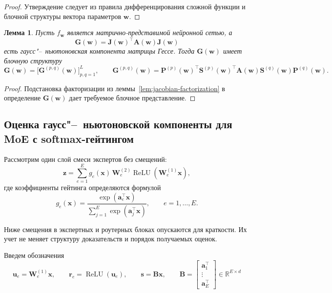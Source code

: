 \documentclass[11pt]{extarticle}
\DeclareMathOperator{\ReLU}{ReLU}
\newtheorem{lemma}{Лемма}
\theoremstyle{definition}
\theoremstyle{plain}
\theoremstyle{remark}
\begin{document}
\begin{proof}
Утверждение следует из правила дифференцирования сложной функции и блочной структуры вектора параметров $\mathbf w$.
\end{proof}

\begin{lemma}
\label{lem:GN-block-factorization}
Пусть $f_{\mathbf w}$ является матрично-представимой нейронной сетью, а
$$
\mathbf G(\mathbf w)=\mathbf J(\mathbf w)^\top \mathbf A(\mathbf w)\mathbf J(\mathbf w)
$$
есть гаусс"--~ньютоновская компонента матрицы Гессе. Тогда $\mathbf G(\mathbf w)$ имеет блочную структуру
$$
\mathbf G(\mathbf w)=\bigl[\mathbf G^{(p,q)}(\mathbf w)\bigr]_{p,q=1}^L,
\qquad
\mathbf G^{(p,q)}(\mathbf w)
=
\mathbf P^{(p)}(\mathbf w)^\top
\mathbf S^{(p)}(\mathbf w)^\top
\mathbf A(\mathbf w)
\mathbf S^{(q)}(\mathbf w)
\mathbf P^{(q)}(\mathbf w).
$$
\end{lemma}

\begin{proof}
Подстановка факторизации из леммы~\ref{lem:jacobian-factorization} в определение $\mathbf G(\mathbf w)$ дает требуемое блочное представление.
\end{proof}

\subsection{Оценка гаусс"--~ньютоновской компоненты для MoE с softmax-гейтингом}

Рассмотрим один слой смеси экспертов без смещений:
\begin{equation}
    \label{eq:moe-model-softmax}
    \mathbf z
    =
    \sum\limits_{e=1}^{E}
    g_e(\mathbf x)\,
    \mathbf W_e^{(2)}
    \ReLU\!\left(\mathbf W_e^{(1)}\mathbf x\right),
\end{equation}
где коэффициенты гейтинга определяются формулой
\begin{equation}
    \label{eq:moe-softmax-gating}
    g_e(\mathbf x)
    =
    \frac{\exp(\mathbf a_e^\top \mathbf x)}
    {\sum\limits_{j=1}^{E}\exp(\mathbf a_j^\top \mathbf x)},
    \qquad e=1,\dots,E.
\end{equation}

Ниже смещения в экспертных и роутерных блоках опускаются для краткости. Их учет не меняет структуру доказательств и порядок получаемых оценок.

Введем обозначения
$$
\mathbf u_e=\mathbf W_e^{(1)}\mathbf x,
\qquad
\mathbf r_e=\ReLU(\mathbf u_e),
\qquad
\mathbf s=\mathbf B\mathbf x,
\qquad
\mathbf B=
\begin{bmatrix}
\mathbf a_1^\top\\
\vdots\\
\mathbf a_E^\top
\end{bmatrix}\in\mathbb R^{E\times d}
$$
\end{document}
